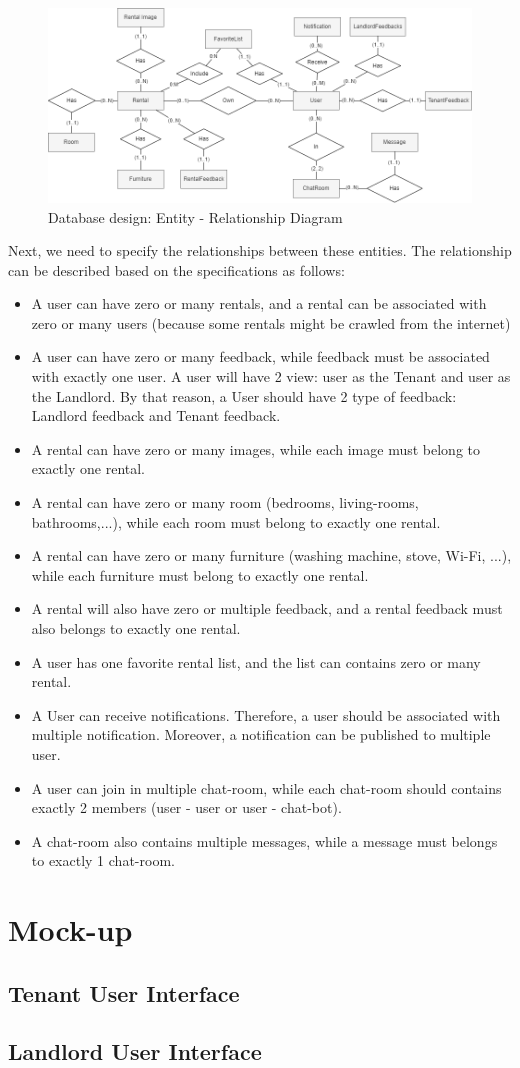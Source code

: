 \begin{figure}[H]
    \centering
    \includegraphics[width=\textwidth]{Images/ERD-Relationship.png}
    \caption{Database design: Entity - Relationship Diagram}
    \label{fig:erd-relationship}
\end{figure}
Next, we need to specify the relationships between these entities. The relationship can be described based on the specifications as follows:
\begin{itemize}
    \item A user can have zero or many rentals, and a rental can be associated with zero or many users (because some rentals might be crawled from the internet)
    \item A user can have zero or many feedback, while feedback must be associated with exactly one user. A user will have 2 view: user as the Tenant and user as the Landlord. By that reason, a User should have 2 type of feedback: Landlord feedback and Tenant feedback.
    \item A rental can have zero or many images, while each image must belong to exactly one rental.
    \item A rental can have zero or many room (bedrooms, living-rooms, bathrooms,...), while each room must belong to exactly one rental.
    \item A rental can have zero or many furniture (washing machine, stove, Wi-Fi, ...), while each furniture must belong to exactly one rental.
    \item A rental will also have zero or multiple feedback, and a rental feedback must also belongs to exactly one rental. 
    \item A user has one favorite rental list, and the list can contains zero or many rental.
    \item A User can receive notifications. Therefore, a user should be associated with multiple notification. Moreover, a notification can be published to multiple user.
    \item A user can join in multiple chat-room, while each chat-room should contains exactly 2 members (user - user or user - chat-bot).
    \item A chat-room also contains multiple messages, while a message must belongs to exactly 1 chat-room. 
\end{itemize}
\section{Mock-up}
\subsection{Tenant User Interface}
\subsection{Landlord User Interface}